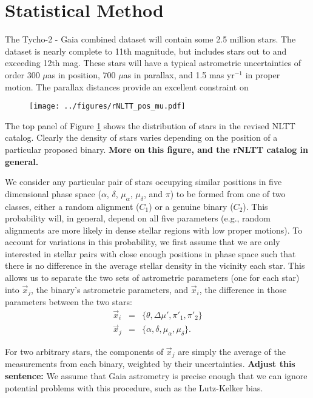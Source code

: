\documentclass[usenatbib]{mnras}
\begin{document}
\section{Statistical Method}

The Tycho-2 - Gaia combined dataset will contain some 2.5 million stars. The dataset is nearly complete to 11th magnitude, but includes stars out to and exceeding 12th mag. These stars will have a typical astrometric uncertainties of order 300 $\mu$as in position, 700 $\mu$as in parallax, and 1.5 mas yr$^{-1}$ in proper motion. The parallax distances provide an excellent constraint on 


\begin{figure}
\begin{center}
\texttt{[image: ../figures/rNLTT\_pos\_mu.pdf]}
\caption{}
\label{fig:rNLTT_pos_mu}
\end{center}
\end{figure}

The top panel of Figure \ref{fig:rNLTT_pos_mu} shows the distribution of stars in the revised NLTT catalog. Clearly the density of stars varies depending on the position of a particular proposed binary. {\bf More on this figure, and the rNLTT catalog in general.}



We consider any particular pair of stars occupying similar positions in five dimensional phase space ($\alpha$, $\delta$, $\mu_{\alpha}$, $\mu_{\delta}$, and $\pi$) to be formed from one of two classes, either a random alignment ($C_1$) or a genuine binary ($C_2$). This probability will, in general, depend on all five parameters (e.g., random alignments are more likely in dense stellar regions with low proper motions). To account for variations in this probability, we first assume that we are only interested in stellar pairs with close enough positions in phase space such that there is no difference in the average stellar density in the vicinity each star. This allows us to separate the two sets of astrometric parameters (one for each star) into $\vec{x}_j$, the binary's astrometric parameters, and $\vec{x}_i$, the difference in those parameters between the two stars:
\begin{eqnarray}
\vec{x}_i &=& \{\theta, \Delta \mu', \pi'_1, \pi'_2 \} \\
\vec{x}_j &=& \{ \alpha, \delta, \mu_{\alpha}, \mu_{\delta} \}.
\end{eqnarray}

For two arbitrary stars, the components of $\vec{x}_j$ are simply the average of the measurements from each binary, weighted by their uncertainties. {\bf Adjust this sentence:} We assume that Gaia astrometry is precise enough that we can ignore potential problems with this procedure, such as the Lutz-Kelker bias. 
\end{document}
